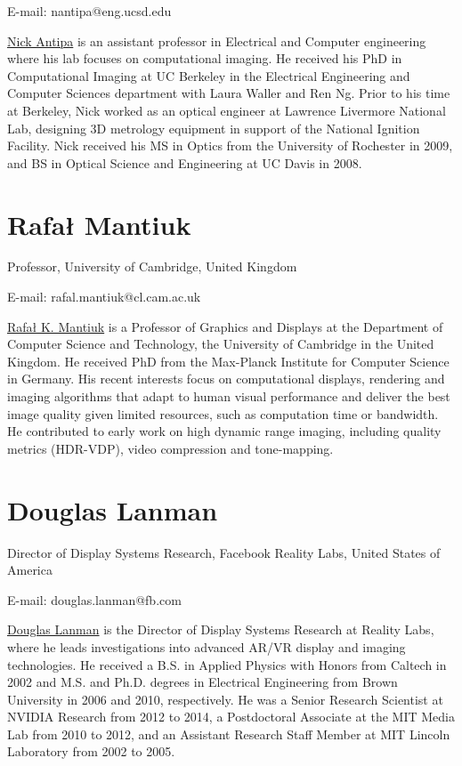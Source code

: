 E-mail: nantipa@eng.ucsd.edu

\href{http://nickantipa.com/}{Nick Antipa} is an assistant professor in Electrical and Computer engineering where his lab focuses on computational imaging.
He received his PhD in Computational Imaging at UC Berkeley in the Electrical Engineering and Computer Sciences department with Laura Waller and Ren Ng.
Prior to his time at Berkeley, Nick worked as an optical engineer at Lawrence Livermore National Lab, designing 3D metrology equipment in support of the National Ignition Facility.
Nick received his MS in Optics from the University of Rochester in 2009, and BS in Optical Science and Engineering at UC Davis in 2008.

\section*{Rafał Mantiuk}
Professor, University of Cambridge, United Kingdom

E-mail: rafal.mantiuk@cl.cam.ac.uk

\href{http://www.cl.cam.ac.uk/~rkm38/}{Rafał K. Mantiuk} is a Professor of Graphics and Displays at the Department of Computer Science and Technology, the University of Cambridge in the United Kingdom.
He received PhD from the Max-Planck Institute for Computer Science in Germany.
His recent interests focus on computational displays, rendering and imaging algorithms that adapt to human visual performance and deliver the best image quality given limited resources, such as computation time or bandwidth.
He contributed to early work on high dynamic range imaging, including quality metrics (HDR-VDP), video compression and tone-mapping.

\section*{Douglas Lanman}
Director of Display Systems Research, Facebook Reality Labs, United States of America

E-mail: douglas.lanman@fb.com

\href{https://alumni.media.mit.edu/~dlanman/}{Douglas Lanman} is the Director of Display Systems Research at Reality Labs, where he leads investigations into advanced AR/VR display and imaging technologies.
He received a B.S. in Applied Physics with Honors from Caltech in 2002 and M.S. and Ph.D. degrees in Electrical Engineering from Brown University in 2006 and 2010, respectively.
He was a Senior Research Scientist at NVIDIA Research from 2012 to 2014, a Postdoctoral Associate at the MIT Media Lab from 2010 to 2012, and an Assistant Research Staff Member at MIT Lincoln Laboratory from 2002 to 2005.

